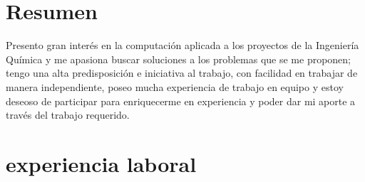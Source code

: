 \documentclass[espanol]{cv-style}     %
\begin{document}
\section{Resumen}
  \vspace{-0.2cm}
Presento gran interés en la computación aplicada a los proyectos de la Ingeniería Química y me apasiona buscar soluciones a los problemas que se me proponen; tengo una alta predisposición e iniciativa al trabajo, con facilidad en trabajar de manera independiente, poseo mucha experiencia de trabajo en equipo y estoy deseoso de participar para enriquecerme en experiencia y poder dar mi aporte a través del trabajo requerido.

\section{experiencia laboral}
\end{document}
